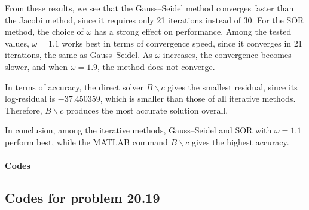 \documentclass{ctexart}
\begin{document}
From these results, we see that the Gauss--Seidel method converges faster than the Jacobi method, since it requires only 21 iterations instead of 30. For the SOR method, the choice of $\omega$ has a strong effect on performance. Among the tested values, $\omega=1.1$ works best in terms of convergence speed, since it converges in 21 iterations, the same as Gauss--Seidel. As $\omega$ increases, the convergence becomes slower, and when $\omega=1.9$, the method does not converge.

In terms of accuracy, the direct solver $B\backslash c$ gives the smallest residual, since its log-residual is $-37.450359$, which is smaller than those of all iterative methods. Therefore, $B\backslash c$ produces the most accurate solution overall.

In conclusion, among the iterative methods, Gauss--Seidel and SOR with $\omega=1.1$ perform best, while the MATLAB command $B\backslash c$ gives the highest accuracy.
\paragraph{Codes}
\subsection{Codes for problem 20.19}
% 
{\noindent}
\end{document}
